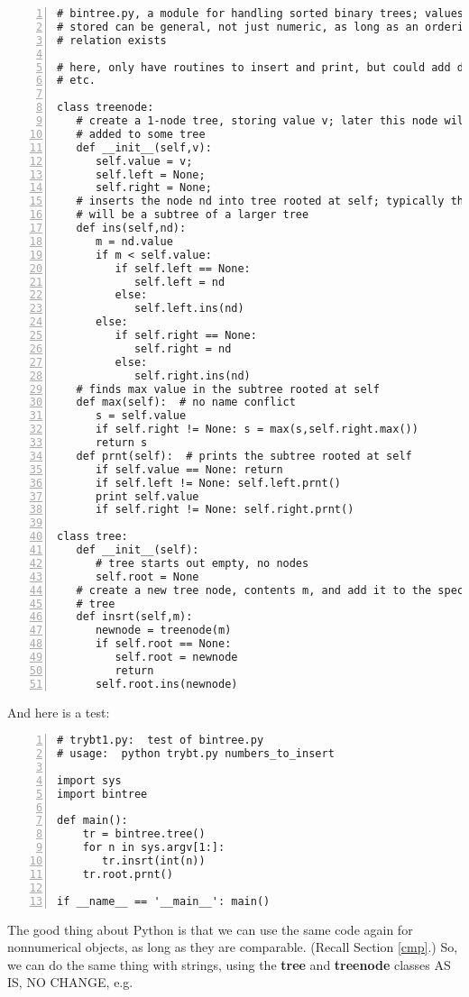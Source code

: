 \begin{Verbatim}[fontsize=\relsize{-2},numbers=left]
# bintree.py, a module for handling sorted binary trees; values to be
# stored can be general, not just numeric, as long as an ordering 
# relation exists 

# here, only have routines to insert and print, but could add delete,
# etc.

class treenode:
   # create a 1-node tree, storing value v; later this node will be
   # added to some tree
   def __init__(self,v):  
      self.value = v;
      self.left = None;
      self.right = None;
   # inserts the node nd into tree rooted at self; typically that tree
   # will be a subtree of a larger tree
   def ins(self,nd):  
      m = nd.value
      if m < self.value:
         if self.left == None:
            self.left = nd
         else:  
            self.left.ins(nd)
      else:
         if self.right == None:
            self.right = nd
         else: 
            self.right.ins(nd)
   # finds max value in the subtree rooted at self
   def max(self):  # no name conflict
      s = self.value
      if self.right != None: s = max(s,self.right.max())
      return s
   def prnt(self):  # prints the subtree rooted at self
      if self.value == None: return
      if self.left != None: self.left.prnt()
      print self.value
      if self.right != None: self.right.prnt()

class tree:
   def __init__(self):
      # tree starts out empty, no nodes
      self.root = None  
   # create a new tree node, contents m, and add it to the specified
   # tree
   def insrt(self,m):
      newnode = treenode(m)
      if self.root == None:
         self.root = newnode
         return
      self.root.ins(newnode)
\end{Verbatim}

And here is a test:

\begin{Verbatim}[fontsize=\relsize{-2},numbers=left]
# trybt1.py:  test of bintree.py
# usage:  python trybt.py numbers_to_insert

import sys
import bintree

def main():
    tr = bintree.tree()
    for n in sys.argv[1:]:
       tr.insrt(int(n))
    tr.root.prnt()

if __name__ == '__main__': main()
\end{Verbatim}

The good thing about Python is that we can use the same code again for
nonnumerical objects, as long as they are comparable.  (Recall Section
\ref{cmp}.)  So, we can do the same thing with strings, using the {\bf
tree} and {\bf treenode} classes AS IS, NO CHANGE, e.g.

